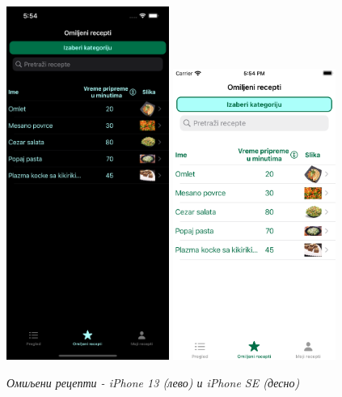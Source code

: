\documentclass[12pt,oneside]{memoir}
\begin{document}
\begin{figure} [H]
    \centering
    \captionsetup{justification=centering}
    \includegraphics[width=0.475\textwidth]{images/simulators/view images/dark - favorites.png} 
    \hfill
    \includegraphics[width=0.475\textwidth]{images/simulators/view images/light - favorites.png}
    \caption{\textit{Омиљени рецепти - iPhone 13 (лево) и iPhone SE (десно)}}
    \label{slika:омиљени_1}
\end{figure}
\end{document}
